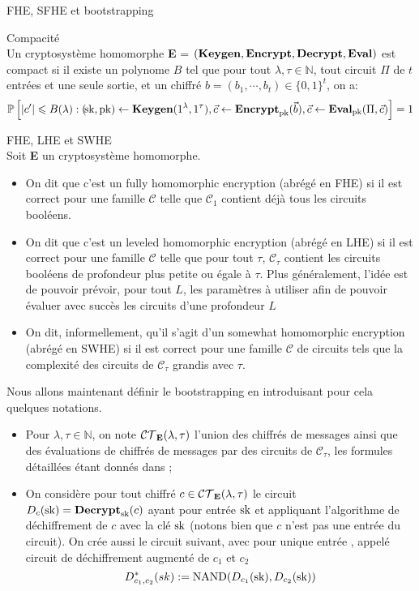 \begin{section}{FHE, SFHE et bootstrapping}
\begin{definition}{Compacité} \\
Un cryptosystème homomorphe \textbf{E} = $(\text{\textbf{Keygen}}, \text{\textbf{Encrypt}}, \text{\textbf{Decrypt}}, \text{\textbf{Eval}})$ 
est compact si il existe un polynome $B$ tel que pour tout $\lambda, \tau
\in \mathbb{N}$, tout circuit $\Pi$ de $t$ entrées et une seule sortie, et un
chiffré $b = (b_1,\cdots,b_t) \in \{0,1\}^t$, on a:
\[ 
\mathbb{P} \left[ |c'| \leqslant B(\lambda): (\!\text{sk},\text{pk}) \leftarrow \text{\textbf{Keygen}}(1^\lambda,
1^\tau), \vec{c} \leftarrow \text{\textbf{Encrypt}}_{\text{pk}}(\vec{b}), \vec{c} \leftarrow 
\text{\textbf{Eval}}_{\text{pk}}(\Pi, \vec{c}) \right] = 1
\]
\end{definition}

\begin{definition}{FHE, LHE et SWHE} \\
Soit \textbf{E} un cryptosystème homomorphe.
\begin{itemize}
\item On dit que c'est un fully homomorphic encryption (abrégé en FHE) si il est correct pour
une famille $\mathcal{C}$ telle que $\mathcal{C}_1$ contient déjà tous les
circuits booléens. 
\item On dit que c'est un  leveled homomorphic encryption (abrégé en LHE)  si il est correct pour une famille
$\mathcal{C}$ telle que pour tout $\tau$, $\mathcal{C}_\tau$ contient les circuits booléens de profondeur plus petite ou
égale à $\tau$. Plus généralement, l'idée est de pouvoir prévoir, pour tout $L$, les paramètres à utiliser afin de
pouvoir évaluer avec succès les circuits d'une profondeur $L$ 
\item On dit, informellement, qu'il s'agit d'un somewhat homomorphic encryption (abrégé en SWHE) si il est correct pour
une famille $\mathcal{C}$ de circuits tels que la complexité des circuits de $\mathcal{C}_\tau$ grandis avec $\tau$.
\end{itemize}
\end{definition}

Nous allons maintenant définir le bootstrapping en introduisant pour cela
quelques notations.

\begin{itemize}
\item Pour $\lambda, \tau \in \mathbb{N}$, on note
$\mathcal{CT}_{\text{\textbf{E}}}(\lambda,\tau)$ l'union des chiffrés de messages 
ainsi que des évaluations de chiffrés de messages par des circuits de 
$\mathcal{C}_\tau$, les formules détaillées étant donnés dans \cite{halevi};
\item On considère pour tout chiffré $c\in\mathcal{CT}_{\text{\textbf{E}}}(\lambda,\tau)$ 
le circuit $D_c(\text{sk}) = \text{\textbf{Decrypt}}_{\text{sk}}(c)$ ayant pour entrée $\text{sk}$ et appliquant 
l'algorithme de déchiffrement de $c$ avec la clé $\text{sk}$ (notons bien que $c$
n'est pas une entrée du circuit). On crée aussi le circuit suivant, avec pour
unique entrée \sk, appelé circuit de déchiffrement augmenté de $c_1$ et $c_2$
\[ D^*_{c_1,c_2}(sk) := \text{NAND}(D_{c_1}(\text{sk}), D_{c_2}(\text{sk}))\]
\end{itemize}


\end{section}
